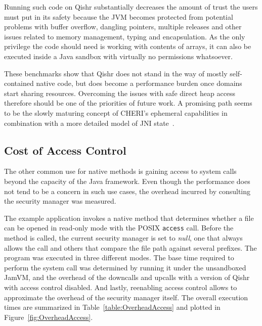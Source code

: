 \documentclass[a4paper,12pt,twoside,openright]{report}
\begin{document}
Running such code on Qishr substantially decreases the amount of trust the users must put in its safety because the JVM becomes protected from potential problems with buffer overflow, dangling pointers, multiple releases and other issues related to memory management, typing and encapsulation. As the only privilege the code should need is working with contents of arrays, it can also be executed inside a Java sandbox with virtually no permissions whatsoever.

These benchmarks show that Qishr does not stand in the way of mostly self-contained native code, but does become a performance burden once domains start sharing resources. Overcoming the issues with safe direct heap access therefore should be one of the priorities of future work. A promising path seems to be the slowly maturing concept of CHERI's ephemeral capabilities in combination with a more detailed model of JNI state~\cite{Tan:2010:JNIFormalModel}. 

\subsection{Cost of Access Control}

The other common use for native methods is gaining access to system calls beyond the capacity of the Java framework. Even though the performance does not tend to be a concern in such use cases, the overhead incurred by consulting the security manager was measured.

The example application invokes a native method that determines whether a file can be opened in read-only mode with the POSIX \texttt{access} call. Before the method is called, the current security manager is set to \emph{null}, one that always allows the call and others that compare the file path against several prefixes. The program was executed in three different modes. The base time required to perform the system call was determined by running it under the unsandboxed JamVM, and the overhead of the downcalls and upcalls with a version of Qishr with access control disabled. And lastly, reenabling access control allows to approximate the overhead of the security manager itself. The overall execution times are summarized in Table~\ref{table:OverheadAccess} and plotted in Figure~\ref{fig:OverheadAccess}.
\end{document}
